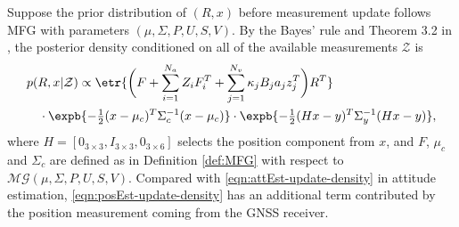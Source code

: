 Suppose the prior distribution of $(R,x)$ before measurement update follows MFG with parameters $(\mu,\Sigma,P,U,S,V)$. 
By the Bayes' rule and Theorem 3.2 in \cite{lee2018bayesian}, the posterior density conditioned on all of the available measurements $\mathcal{Z}$ is 
\begin{align} \label{eqn:posEst-update-density}
	&p(R,x\lvert \mathcal{Z}) \propto \etr{ \bigg( F + \sum_{i=1}^{N_a}Z_iF_i^T + \sum_{j=1}^{N_v}\kappa_jB_ja_jz_j^T \bigg)R^T } \nonumber \\
	&\quad \cdot \expb{-\tfrac{1}{2}(x-\mu_c)^T\Sigma_c^{-1}(x-\mu_c)} \cdot \expb{-\tfrac{1}{2}(Hx-y)^T\Sigma_y^{-1}(Hx-y)},
\end{align}
where $H = [0_{3\times 3}, I_{3\times 3}, 0_{3\times 6}]$ selects the position component from $x$, and $F$, $\mu_c$ and $\Sigma_c$ are defined as in Definition \ref{def:MFG} with respect to $\mathcal{MG}(\mu,\Sigma,P,U,S,V)$.
Compared with \eqref{eqn:attEst-update-density} in attitude estimation, \eqref{eqn:posEst-update-density} has an additional term contributed by the position measurement coming from the GNSS receiver.


